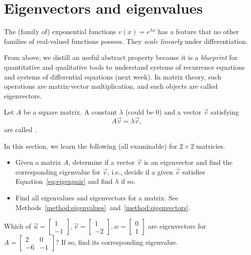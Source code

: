 \documentclass[../main.tex]{subfiles}
\begin{document}
 \section{Eigenvectors and eigenvalues}

The (family of) exponential functions \(v(x) = e^{\lambda x}\) has a feature that no other families of real-valued  functions possess. They \emph{scale linearly} under differentiation.

From above, we distill an useful abstract property  because it is a \emph{blueprint} for quantitative and qualitative tools to understand systems of recurrence equations and systems of differential equations (next week). In matrix theory, such operations are matrix-vector multiplication, and such objects are called eigenvectors.  

\begin{definition}
  Let \(A\) be a square matrix. A constant \(\lambda\) (could be \(0\)) and a  vector \(\vec{v}\) satisfying 
  \begin{equation} \label{eq:eigenpair}
    A \vec{v} = \lambda \vec{v},
  \end{equation}
  are called .
\end{definition}

In this section, we learn the following (all examinable) for \(2 \times 2\) matricies. 
\begin{itemize}
  \item Given a matrix \(A\), determine if a vector \(\vec{v}\) is an eigenvector and find the corresponding eigenvalue for \(\vec{v}\), i.e., decide if a given \(\vec{v}\) satisfies Equation~\ref{eq:eigenpair} and find \(\lambda\) if so.
  \item Find all eigenvalues and eigenvectors for a matrix. See Methods~\ref{method:eigenvalues}~and~\ref{method:eigenvectors}.
\end{itemize}

\begin{example}
  Which of \(\vec{u} = \begin{bmatrix} 1 \\ -1 \end{bmatrix}, \vec{v} = \begin{bmatrix} 1 \\ -2 \end{bmatrix}, w = \begin{bmatrix}  0 \\ 1 \end{bmatrix}\) are eigenvectors for \(A = \begin{bmatrix} 2 & 0 \\ -6 & -1 \end{bmatrix}\)? If so, find its corresponding eigenvalue. 

\end{example}
\clearpage
\end{document}
